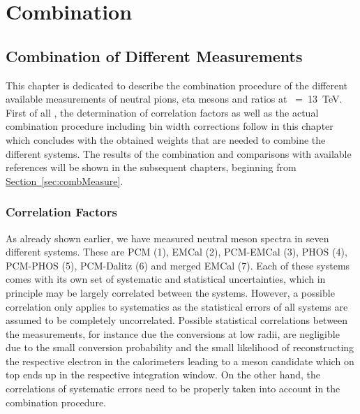 \section{Combination}
\subsection{Combination of Different Measurements}\label{chapter:combination}

This chapter is dedicated to describe the combination procedure of the different available measurements of neutral pions, eta mesons and \EtaToPi ratios at \s~=~13~TeV.
First of all
, the determination of correlation factors as well as the actual combination procedure including bin width corrections follow in this chapter which concludes with the obtained weights that are needed to combine the different systems.
The results of the combination and comparisons with available references will be shown in the subsequent chapters, beginning from \hyperref[sec:combMeasure]{Section~\ref*{sec:combMeasure}}.

\subsubsection{Correlation Factors}
 As already shown earlier, we have measured neutral meson spectra in seven different systems. These are \acs{PCM} (1), \acs{EMCal} (2), \acs{PCM}-\acs{EMCal} (3), \acs{PHOS} (4), \acs{PCM}-\acs{PHOS} (5), \acs{PCM}-\acs{Dalitz} (6) and merged \acs{EMCal} (7). Each of these systems comes with its own set of systematic and statistical uncertainties, which in principle may be largely correlated between the systems. However, a possible correlation only applies to systematics as the statistical errors of all systems are assumed to be completely uncorrelated. Possible statistical correlations between the measurements, for instance due the conversions at low radii, are negligible due to the small conversion probability and the small likelihood of reconstructing the respective electron in the calorimeters leading to a meson candidate which on top ends up in the respective integration window. On the other hand, the correlations of systematic errors need to be properly taken into account in the combination procedure.

